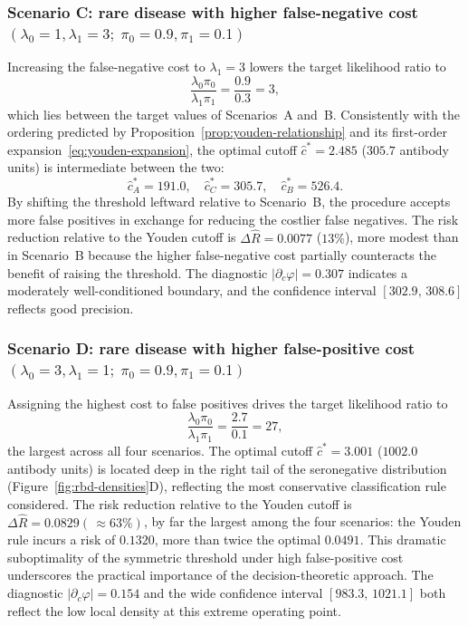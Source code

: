 \documentclass[11pt,a4paper]{article}
\theoremstyle{definition}
\theoremstyle{remark}
\newcommand{\1}{\mathbf{1}}
\begin{document}
\subsubsection{Scenario C: rare disease with higher
false-negative cost $(\lambda_0=1,\lambda_1=3;\;\pi_0=0.9,\pi_1=0.1)$}
Increasing the false-negative cost to $\lambda_1=3$
lowers the target likelihood ratio to
\[
\frac{\lambda_0\pi_0}{\lambda_1\pi_1}
=
\frac{0.9}{0.3}
=3,
\]
which lies between the target values of Scenarios~A
and~B.
Consistently with the ordering predicted by Proposition~\ref{prop:youden-relationship} and its first-order expansion~\eqref{eq:youden-expansion}, the
optimal cutoff $\hat{c}^*=2.485$ ($305.7$ antibody units)
is intermediate between the two:
\[
\hat{c}^*_A
=191.0, \quad \hat{c}^*_C =305.7, \quad \hat{c}^*_B=526.4.
\]
By shifting the threshold leftward relative to Scenario~B,
the procedure accepts more false positives in exchange
for reducing the costlier false negatives.
The risk reduction relative to the Youden cutoff is
$\Delta\hat{R}=0.0077$ ($13\%$), more modest than in
Scenario~B because the higher false-negative cost
partially counteracts the benefit of raising the threshold.
The diagnostic $|\partial_c\varphi|=0.307$ indicates a
moderately well-conditioned boundary, and the confidence
interval $[302.9,\,308.6]$ reflects good precision.

\subsubsection{Scenario D: rare disease with higher
false-positive cost $(\lambda_0=3,\lambda_1=1;\;\pi_0=0.9,\pi_1=0.1)$}
Assigning the highest cost to false positives drives the
target likelihood ratio to
\[
\frac{\lambda_0\pi_0}{\lambda_1\pi_1}
= \frac{2.7}{0.1}=27,
\]
the largest across all four scenarios.
The optimal cutoff $\hat{c}^*=3.001$ ($1002.0$ antibody
units) is located deep in the right tail of the
seronegative distribution (Figure~\ref{fig:rbd-densities}D),
reflecting the most conservative classification rule
considered.
The risk reduction relative to the Youden cutoff is
$\Delta\hat{R}=0.0829 (\,\approx 63\%)$, by far the largest among the
four scenarios: the Youden rule incurs a risk of
$0.1320$, more than twice the optimal $0.0491$.
This dramatic suboptimality of the symmetric threshold
under high false-positive cost underscores the practical
importance of the decision-theoretic approach.
The diagnostic $|\partial_c\varphi|=0.154$ and the wide
confidence interval $[983.3,\,1021.1]$ both reflect the
low local density at this extreme operating point.
\end{document}
